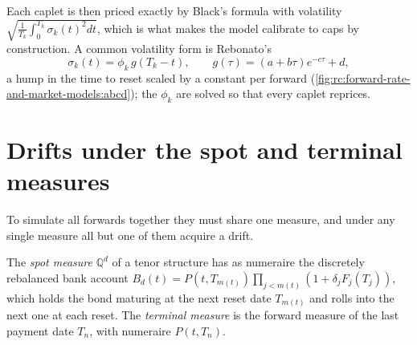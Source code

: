Each caplet is then priced exactly by Black's formula with volatility
$\sqrt{\frac1{T_k}\int_0^{T_k}\sigma_k(t)^2dt}$, which is what makes the model
calibrate to caps by construction. A common volatility form is Rebonato's
\[
\sigma_k(t) = \phi_k\,g(T_k-t),\qquad g(\tau) = (a+b\tau)e^{-c\tau}+d ,
\]
a hump in the time to reset scaled by a constant per forward
(\cref{fig:rc:forward-rate-and-market-models:abcd}); the $\phi_k$ are solved so
that every caplet reprices.

\begin{omfigure}

\label{fig:rc:forward-rate-and-market-models:abcd}
\end{omfigure}

\section{Drifts under the spot and terminal measures}

To simulate all forwards together they must share one measure, and under any
single measure all but one of them acquire a drift.

\begin{definition}\label{def:rc:forward-rate-and-market-models:measures}
The \emph{spot measure} $\mathbb Q^d$ of a tenor structure has
as numeraire the discretely rebalanced bank account $B_d(t) =
P(t,T_{m(t)})\prod_{j<m(t)}(1+\delta_jF_j(T_j))$, which holds the bond maturing at
the next reset date $T_{m(t)}$ and rolls into the next one at each reset. The
\emph{terminal measure} is the forward measure of the last
payment date $T_n$, with numeraire $P(t,T_n)$.
\end{definition}

